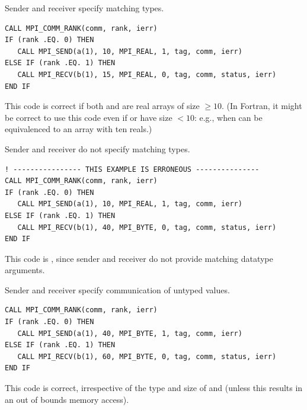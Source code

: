 \begin{example}
\label{pt2pt-exA}
%
%
Sender and receiver specify matching types.
\begin{lstlisting}[language={[MPI]Fortran}]
CALL MPI_COMM_RANK(comm, rank, ierr)
IF (rank .EQ. 0) THEN
   CALL MPI_SEND(a(1), 10, MPI_REAL, 1, tag, comm, ierr)
ELSE IF (rank .EQ. 1) THEN
   CALL MPI_RECV(b(1), 15, MPI_REAL, 0, tag, comm, status, ierr)
END IF
\end{lstlisting}

This code is correct if both  and  are real arrays of
size $\ge 10$. (In Fortran, it might be correct to use this code
even if  or  have size $< 10$: e.g., when  can
be equivalenced to an array with ten reals.)
\end{example}

\begin{example}
\label{pt2pt-exB}
%
%
Sender and receiver do not specify matching types.

\begin{lstlisting}[language={[MPI]Fortran}]
! ---------------- THIS EXAMPLE IS ERRONEOUS ---------------
CALL MPI_COMM_RANK(comm, rank, ierr)
IF (rank .EQ. 0) THEN
   CALL MPI_SEND(a(1), 10, MPI_REAL, 1, tag, comm, ierr)
ELSE IF (rank .EQ. 1) THEN
   CALL MPI_RECV(b(1), 40, MPI_BYTE, 0, tag, comm, status, ierr)
END IF
\end{lstlisting}

This code is , since sender and receiver do not provide
matching datatype arguments.
\end{example}

\begin{example}
\label{pt2pt-exC}
%
%
Sender and receiver specify communication of untyped values.
\begin{lstlisting}[language={[MPI]Fortran}]
CALL MPI_COMM_RANK(comm, rank, ierr)
IF (rank .EQ. 0) THEN
   CALL MPI_SEND(a(1), 40, MPI_BYTE, 1, tag, comm, ierr)
ELSE IF (rank .EQ. 1) THEN
   CALL MPI_RECV(b(1), 60, MPI_BYTE, 0, tag, comm, status, ierr)
END IF
\end{lstlisting}

This code is correct, irrespective of the type and size of  and
 (unless this results in an out of bounds memory access).
\end{example}

